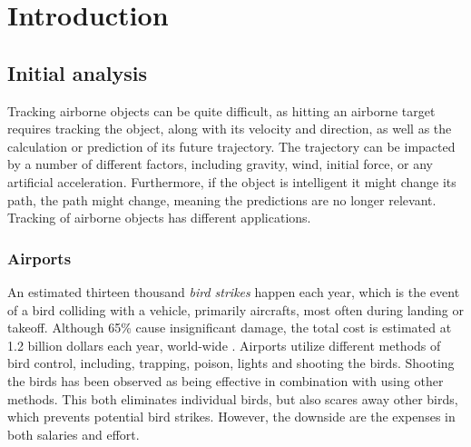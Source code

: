 \chapter{Introduction}
\section{Initial analysis}
Tracking airborne objects can be quite difficult, as hitting an airborne target requires tracking the object, along with its velocity and direction, as well as the calculation or prediction of its future trajectory.
The trajectory can be impacted by a number of different factors, including gravity, wind, initial force, or any artificial acceleration.
Furthermore, if the object is intelligent it might change its path, the path might change, meaning the predictions are no longer relevant.
Tracking of airborne objects has different applications.
\subsection{Airports}
An estimated thirteen thousand \textit{bird strikes} happen each year, which is the event of a bird colliding with a vehicle, primarily aircrafts\cite{WildlifeStrikeReport}, most often during landing or takeoff\cite{CostOfBirdstrikes}.
Although 65\% cause insignificant damage, the total cost is estimated at 1.2 billion dollars each year, world-wide \cite{CostOfBirdstrikes}.
Airports utilize different methods of bird control, including, trapping, poison, lights and shooting the birds\cite{BirdControlAtAirports}.
Shooting the birds has been observed as being effective in combination with using other methods.
This both eliminates individual birds, but also scares away other birds, which prevents potential bird strikes.
However, the downside are the expenses in both salaries and effort.

